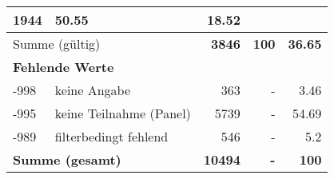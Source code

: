 \begin{longtable}{lXrrr}
       \num{1944} &
       \num[round-mode=places,round-precision=2]{50,55} &
         \num[round-mode=places,round-precision=2]{18,52} \\
     \midrule
     \multicolumn{2}{l}{Summe (gültig)} &
       \textbf{\num{3846}} &
     \textbf{100} &
       \textbf{\num[round-mode=places,round-precision=2]{36,65}} \\
     \multicolumn{5}{l}{\textbf{Fehlende Werte}}\\
       -998 &
       keine Angabe &
         \num{363} &
        - &
         \num[round-mode=places,round-precision=2]{3,46} \\
       -995 &
       keine Teilnahme (Panel) &
         \num{5739} &
        - &
         \num[round-mode=places,round-precision=2]{54,69} \\
       -989 &
       filterbedingt fehlend &
         \num{546} &
        - &
         \num[round-mode=places,round-precision=2]{5,2} \\
     \midrule
     \multicolumn{2}{l}{\textbf{Summe (gesamt)}} &
          \textbf{\num{10494}} &
        \textbf{-} &
        \textbf{100} \\
     \bottomrule
     \end{longtable}
     
